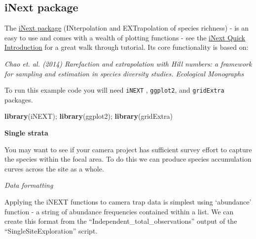 \documentclass[]{book}
\newenvironment{Shaded}{\begin{snugshade}}{\end{snugshade}}
\newcommand{\KeywordTok}[1]{\textcolor[rgb]{0.13,0.29,0.53}{\textbf{#1}}}
\newcommand{\DataTypeTok}[1]{\textcolor[rgb]{0.13,0.29,0.53}{#1}}
\newcommand{\DecValTok}[1]{\textcolor[rgb]{0.00,0.00,0.81}{#1}}
\newcommand{\StringTok}[1]{\textcolor[rgb]{0.31,0.60,0.02}{#1}}
\newcommand{\CommentTok}[1]{\textcolor[rgb]{0.56,0.35,0.01}{\textit{#1}}}
\newcommand{\OperatorTok}[1]{\textcolor[rgb]{0.81,0.36,0.00}{\textbf{#1}}}
\newcommand{\NormalTok}[1]{#1}
\begin{document}
\subsection{iNext package}\label{inext-package}

The \href{https://cran.r-project.org/web/packages/iNEXT/}{iNext package}
(INterpolation and EXTrapolation of species richness) - is an easy to
use and comes with a wealth of plotting functions - see the
\href{https://cran.r-project.org/web/packages/iNEXT/vignettes/Introduction.html}{iNext
Quick Introduction} for a great walk through tutorial. Its core
functionality is based on:

\emph{Chao et. al. (2014) Rarefaction and extrapolation with Hill
numbers: a framework for sampling and estimation in species diversity
studies. Ecological Monographs}

To run this example code you will need \texttt{iNEXT} ,
\texttt{ggplot2}, and \texttt{gridExtra} packages.

\begin{Shaded}
\begin{Highlighting}[]
\KeywordTok{library}\NormalTok{(iNEXT); }\KeywordTok{library}\NormalTok{(ggplot2); }\KeywordTok{library}\NormalTok{(gridExtra)}
\end{Highlighting}
\end{Shaded}

\textbf{Single strata}

You may want to see if your camera project has sufficient survey effort
to capture the species within the focal area. To do this we can produce
species accumulation curves across the site as a whole.

\emph{Data formatting}

Applying the iNEXT functions to camera trap data is simplest using
`abundance' function - a string of abundance frequencies contained
within a list. We can create this format from the
``Independent\_total\_observations'' output of the
``SingleSiteExploration'' script.

\begin{Shaded}
\end{Shaded}
\end{document}
